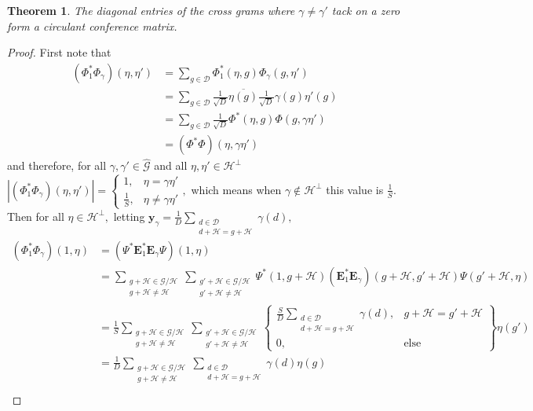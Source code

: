 \documentclass[3p,11pt]{elsarticle}
\newcommand{\bfE}{\mathbf{E}}
\newcommand{\bfy}{\mathbf{y}}
\newcommand{\calD}{\mathcal{D}}
\newcommand{\calG}{\mathcal{G}}
\newcommand{\calH}{\mathcal{H}}
\newcommand{\abs}[1]{|{#1}|}
\newtheorem{theorem}{Theorem}[section]
\theoremstyle{definition}
\begin{document}
\begin{theorem}
\label{thm:Circular Conference Matrix}
The diagonal entries of the cross grams where $\gamma\not=\gamma'$ tack on a zero form a circulant conference matrix.
\end{theorem}
\begin{proof}
First note that 
\begin{align*}
(\Phi_1^*\Phi_\gamma)(\eta,\eta')&=\sum_{g\in\calD}\Phi_1^*(\eta,g)\Phi_\gamma(g,\eta')\\
&=\sum_{g\in\calD}\frac{1}{\sqrt{D}}\overline{\eta(g)}\frac{1}{\sqrt{D}}\gamma(g)\eta'(g)\\
&=\sum_{g\in\calD}\frac{1}{\sqrt{D}}\Phi^*(\eta,g)\Phi(g,\gamma\eta')\\
&=(\Phi^*\Phi)(\eta,\gamma\eta')
\end{align*} and therefore,  for all $\gamma,\gamma'\in\hat{\calG}$ and all $\eta,\eta'\in\calH^\perp$
$\abs{(\Phi_1^*\Phi_\gamma)(\eta,\eta')}=\left\{\begin{array}{cl}
1, &\eta=\gamma\eta'\\
\frac{1}{S}, &\eta\not=\gamma\eta'
\end{array}\right.,$ which means when $\gamma\not\in\calH^\perp$ this value is $\frac{1}{S}.$ Then for all $\eta\in\calH^\perp,$ letting $\bfy_\gamma=\frac{1}{D}\sum_{\substack{d\in\calD\\d+\calH=g+\calH}}\gamma(d),$
\begin{align*}
(\Phi_1^*\Phi_\gamma)(1,\eta)&=(\Psi^*\bfE_1^*\bfE_\gamma\Psi)(1,\eta)\\
&=\sum_{\substack{g+\calH\in\calG/\calH\\g+\calH\not=\calH}}\sum_{\substack{g'+\calH\in\calG/\calH\\g'+\calH\not=\calH}}\Psi^*(1,g+\calH)(\bfE_1^*\bfE_\gamma)(g+\calH,g'+\calH)\Psi(g'+\calH,\eta)\\
&=\frac{1}{S}\sum_{\substack{g+\calH\in\calG/\calH\\g+\calH\not=\calH}}\sum_{\substack{g'+\calH\in\calG/\calH\\g'+\calH\not=\calH}}\left\{\begin{array}{cl}
\frac{S}{D}\sum_{\substack{d\in\calD\\d+\calH=g+\calH}}\gamma(d), & g+\calH=g'+\calH\\
0, &\text{else}
\end{array}\right\}\eta(g')\\
&=\frac{1}{D}\sum_{\substack{g+\calH\in\calG/\calH\\g+\calH\not=\calH}}\sum_{\substack{d\in\calD\\d+\calH=g+\calH}}\gamma(d)\eta(g)\\

\end{align*}
\end{proof}
\end{document}

